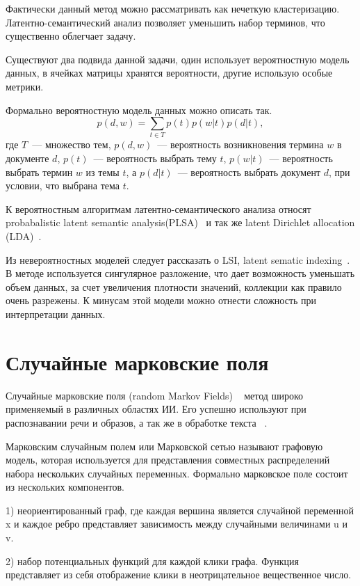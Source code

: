 \documentclass[annotation,times,page4]{itmo-student-thesis}
\begin{document}
Фактически данный метод можно рассматривать как нечеткую кластеризацию. Латентно-семантический анализ позволяет уменьшить набор терминов, что существенно облегчает задачу.

Существуют два подвида данной задачи, один использует вероятностную модель данных, в ячейках матрицы хранятся вероятности, другие использую особые метрики.

Формально вероятностную модель данных можно описать так.
\[
    p(d, w) = \sum_{t \in T} p(t)p(w|t)p(d|t),
\]
где $T$~--- множество тем, $p(d, w)$~--- вероятность возникновения
термина $w$ в документе $d$, $p(t)$~--- вероятность выбрать тему $t$,
$p(w|t)$~--- вероятность выбрать термин $w$ из темы $t$, а
$p(d|t)$~--- вероятность выбрать документ $d$, при условии, что
выбрана тема $t$.

К вероятностным алгоритмам латентно-семантического анализа относят  probabalistic latent semantic analysis(PLSA)~\cite{chemudugunta2007modeling} и так же latent Dirichlet allocation (LDA)~\cite{blei2003latent}.

Из невероятностных моделей следует рассказать о LSI, latent sematic indexing~\cite{deerwester1990indexing}. В методе используется сингулярное разложение, что дает возможность уменьшать объем данных, за счет увеличения плотности значений, коллекции как правило очень разрежены. К минусам этой модели можно отнести сложность при интерпретации данных. 

\section{Случайные марковские поля}
Случайные марковские поля (random Markov Fields) ~\cite{kindermann1980markov} метод широко применяемый в различных областях ИИ. Его успешно используют при распознавании речи и образов, а так же в обработке текста ~\cite{li2009markov, romanenko2014}.

Марковским случайным полем или Марковской сетью называют графовую модель, которая используется для представления совместных распределений набора нескольких случайных переменных. Формально марковское поле состоит из нескольких компонентов.

1) неориентированный граф, где каждая вершина является случайной переменной x и каждое ребро представляет зависимость между случайными величинами u и v.

2) набор потенциальных функций для каждой клики графа. Функция представляет из себя отображение клики в неотрицательное вещественное число.
\end{document}
